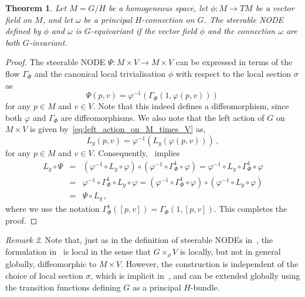 \documentclass[12pt,a4paper]{article}
\numberwithin{equation}{section}
\theoremstyle{plain}
\newtheorem{theorem}{Theorem}[section]
\theoremstyle{definition}
\theoremstyle{remark}
\newtheorem{remark}[theorem]{Remark}
\begin{document}
\begin{theorem}\label{thm:equivariance_steerable_NODE_flow}
    Let $M=G/H$ be a homogeneous space, let $\phi: M \to TM$ be a vector field on $M$, and let $\omega$ be a principal $H$-connection on $G$. The steerable NODE defined by $\phi$ and $\omega$ is $G$-equivariant if the vector field $\phi$ and the connection $\omega$ are both $G$-invariant.
\end{theorem}
\begin{proof}
    The steerable NODE $\Psi: M \times V \to M \times V$ can be expressed in terms of the flow $\Gamma_{\Phi}$ and the canonical local trivialisation $\phi$ with respect to the local section $\sigma$ as
    \begin{equation}
        \Psi(p,v) = \varphi^{-1} \left( \Gamma_{\Phi} (1,\varphi(p,v)) \right)\,
    \end{equation}
    for any $p \in M$ and $v \in V$. Note that this indeed defines a diffeomorphism, since both $\varphi$ and $\Gamma_{\Phi}$ are diffeomorphisms. We also note that the left action of $G$ on $M \times V$ is given by~\eqref{eq:left_action_on_M_times_V} as,
    \begin{equation}
        L_g(p,v) = \varphi^{-1} \left( L_g ( \varphi(p,v)) \right)\,,
    \end{equation}
    for any $p \in M$ and $v \in V$. Consequently,~ implies
    \begin{eqnarray*}
        L_g \circ \Psi &=& \left(\varphi^{-1} \circ L_g \circ \varphi \right) \circ \left( \varphi^{-1} \circ \Gamma^1_{\Phi} \circ \varphi \right) = \varphi^{-1} \circ L_g \circ \Gamma^1_{\Phi} \circ \varphi \\
        &=& \varphi^{-1} \circ \Gamma^1_{\Phi} \circ L_g \circ \varphi = \left(\varphi^{-1} \circ \Gamma^1_{\Phi} \circ \varphi \right) \circ \left( \varphi^{-1} \circ L_g \circ \varphi \right) \\
        &=& \Psi \circ L_g\,,
    \end{eqnarray*}
    where we use the notation $\Gamma^1_{\Phi}([p,v]) = \Gamma_{\Phi}(1,[p,v])$. This completes the proof.
\end{proof}

\begin{remark}
    Note that, just as in the definition of steerable NODEs in~, the formulation in~ is local in the sense that $G \times_{\rho} V$ is locally, but not in general globally, diffeomorphic to $M \times V$. However, the construction is independent of the choice of local section $\sigma$, which is implicit in~, and can be extended globally using the transition functions defining $G$ as a principal $H$-bundle.  
\end{remark}
\end{document}
